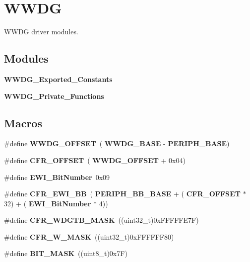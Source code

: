 \section{W\+W\+DG}
\label{group__WWDG}


W\+W\+DG driver modules.  


\subsection*{Modules}
\begin{DoxyCompactItemize}
\item 
\textbf{ W\+W\+D\+G\+\_\+\+Exported\+\_\+\+Constants}
\item 
\textbf{ W\+W\+D\+G\+\_\+\+Private\+\_\+\+Functions}
\end{DoxyCompactItemize}
\subsection*{Macros}
\begin{DoxyCompactItemize}
\item 
\#define \textbf{ W\+W\+D\+G\+\_\+\+O\+F\+F\+S\+ET}~(\textbf{ W\+W\+D\+G\+\_\+\+B\+A\+SE} -\/ \textbf{ P\+E\+R\+I\+P\+H\+\_\+\+B\+A\+SE})
\item 
\#define \textbf{ C\+F\+R\+\_\+\+O\+F\+F\+S\+ET}~(\textbf{ W\+W\+D\+G\+\_\+\+O\+F\+F\+S\+ET} + 0x04)
\item 
\#define \textbf{ E\+W\+I\+\_\+\+Bit\+Number}~0x09
\item 
\#define \textbf{ C\+F\+R\+\_\+\+E\+W\+I\+\_\+\+BB}~(\textbf{ P\+E\+R\+I\+P\+H\+\_\+\+B\+B\+\_\+\+B\+A\+SE} + (\textbf{ C\+F\+R\+\_\+\+O\+F\+F\+S\+ET} $\ast$ 32) + (\textbf{ E\+W\+I\+\_\+\+Bit\+Number} $\ast$ 4))
\item 
\#define \textbf{ C\+F\+R\+\_\+\+W\+D\+G\+T\+B\+\_\+\+M\+A\+SK}~((uint32\+\_\+t)0x\+F\+F\+F\+F\+F\+E7\+F)
\item 
\#define \textbf{ C\+F\+R\+\_\+\+W\+\_\+\+M\+A\+SK}~((uint32\+\_\+t)0x\+F\+F\+F\+F\+F\+F80)
\item 
\#define \textbf{ B\+I\+T\+\_\+\+M\+A\+SK}~((uint8\+\_\+t)0x7\+F)
\end{DoxyCompactItemize}
